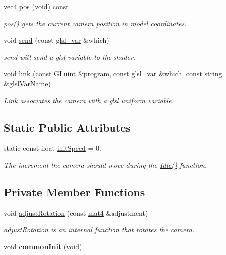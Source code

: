 \begin{DoxyCompactItemize}
\hyperlink{struct_angel_1_1vec4}{vec4} \hyperlink{class_camera_a9982ac5f48fe0af97fefa725080d6da6}{pos} (void) const 
\begin{DoxyCompactList}\small\item\em \hyperlink{class_camera_a9982ac5f48fe0af97fefa725080d6da6}{pos()} gets the current camera position in model coordinates. \end{DoxyCompactList}\item 
void \hyperlink{class_camera_a36cba68c08136242bf5d906f9c0b610c}{send} (const \hyperlink{class_camera_a6ff726a75a430e4f17e5dec42e4d4405}{glsl\-\_\-var} \&which)
\begin{DoxyCompactList}\small\item\em send will send a glsl variable to the shader. \end{DoxyCompactList}\item 
void \hyperlink{class_camera_ad02f12a279c33e7e85dcaf88830d38c7}{link} (const G\-Luint \&program, const \hyperlink{class_camera_a6ff726a75a430e4f17e5dec42e4d4405}{glsl\-\_\-var} \&which, const string \&glsl\-Var\-Name)
\begin{DoxyCompactList}\small\item\em Link associates the camera with a glsl uniform variable. \end{DoxyCompactList}\end{DoxyCompactItemize}
\subsection*{Static Public Attributes}
\begin{DoxyCompactItemize}
\item 
static const float \hyperlink{class_camera_adc88510e14cf2f6d4c3f6b23216211dc}{init\-Speed} = 0.
\begin{DoxyCompactList}\small\item\em The increment the camera should move during the \hyperlink{class_camera_aec3559fe43597656629fdb00157d3c73}{Idle()} function. \end{DoxyCompactList}\end{DoxyCompactItemize}
\subsection*{Private Member Functions}
\begin{DoxyCompactItemize}
\item 
void \hyperlink{class_camera_a7ffc3619f9a5d8e586cb3d96ebdd3188}{adjust\-Rotation} (const \hyperlink{class_angel_1_1mat4}{mat4} \&adjustment)
\begin{DoxyCompactList}\small\item\em adjust\-Rotation is an internal function that rotates the camera. \end{DoxyCompactList}\item 
\hypertarget{class_camera_a20243a7e3eb06ab1265118c5fb9cce9b}{void {\bfseries common\-Init} (void)}\label{class_camera_a20243a7e3eb06ab1265118c5fb9cce9b}

\end{DoxyCompactItemize}

